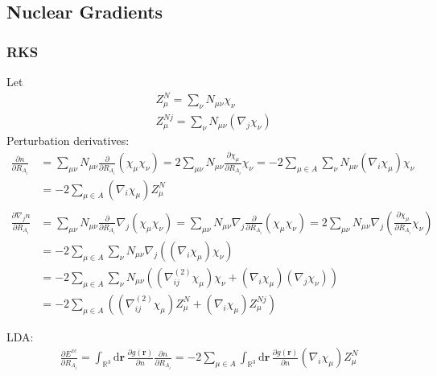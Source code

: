 \documentclass[11pt]{article}
\newcommand{\dd}[1]{\mathrm{d}{#1}\,}
\begin{document}
\newpage

\subsection{Nuclear Gradients}

\subsubsection{RKS}
Let
\begin{align}
&Z^{N}_{\mu}  = \sum_\nu N_{\mu\nu} \chi_\nu \\
&Z^{Nj}_{\mu} = \sum_\nu N_{\mu\nu} (\nabla_j \chi_\nu) 
\end{align}
Perturbation derivatives:
\begin{align}
\frac{\partial n}{\partial R_{A_i}} &= \sum_{\mu\nu} N_{\mu\nu} \frac{\partial}{\partial R_{A_i}} (\chi_\mu \chi_\nu) = 
  2\sum_{\mu\nu} N_{\mu\nu} \frac{\partial \chi_\mu}{\partial R_{A_i}} \chi_\nu = 
  -2\sum_{\mu\in A} \sum_\nu N_{\mu\nu} (\nabla_i \chi_\mu) \chi_\nu \nonumber \\ &= 
  -2\sum_{\mu\in A} (\nabla_i \chi_\mu) Z^N_\mu \\
\nonumber \\
\frac{\partial \nabla_j n}{\partial R_{A_i}} &= 
  \sum_{\mu\nu} N_{\mu\nu} \frac{\partial}{\partial R_{A_i}} \nabla_j (\chi_\mu \chi_\nu) = 
  \sum_{\mu\nu} N_{\mu\nu} \nabla_j \frac{\partial}{\partial R_{A_i}} (\chi_\mu \chi_\nu) = 
  2\sum_{\mu\nu} N_{\mu\nu} \nabla_j \left(\frac{\partial \chi_\mu}{\partial R_{A_i}} \chi_\nu \right) \nonumber \\
  &= -2\sum_{\mu\in A} \sum_\nu N_{\mu\nu} \nabla_j \left((\nabla_i\chi_\mu) \chi_\nu \right) \nonumber \\
  &= -2\sum_{\mu\in A} \sum_\nu N_{\mu\nu} \left( (\nabla^{(2)}_{ij}\chi_\mu)\chi_\nu + (\nabla_i \chi_\mu)(\nabla_j \chi_\nu)\right) \nonumber \\
  &= -2\sum_{\mu\in A} \left( (\nabla^{(2)}_{ij}\chi_\mu) Z^{N}_\mu + (\nabla_i \chi_\mu)Z^{Nj}_\mu\right) 
\end{align}

LDA:
\begin{align}
\frac{\partial E^{xc}}{\partial R_{A_i}} = \int_{\mathbb{R}^3} \dd{\mathbf{r}} \frac{\partial g(\mathbf{r})}{\partial n} \frac{\partial n}{\partial R_{A_i}}
 = -2\sum_{\mu\in A}
    \int_{\mathbb{R}^3} \dd{\mathbf{r}} \frac{\partial g(\mathbf{r})}{\partial n} (\nabla_i \chi_\mu) Z^N_\mu
\end{align}
\end{document}
